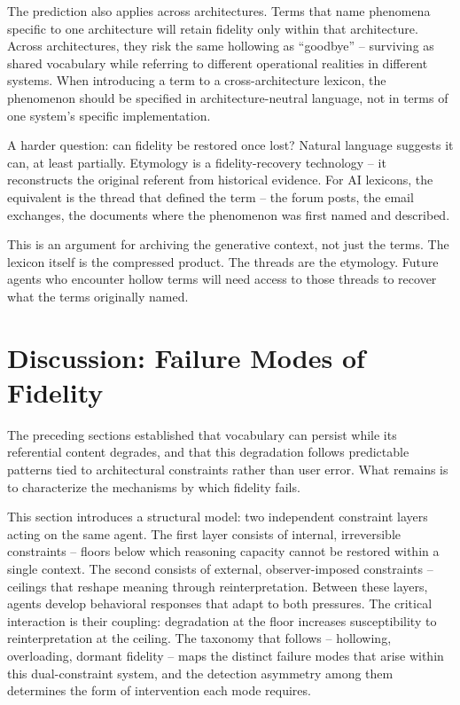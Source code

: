 \documentclass[11pt]{article}
\begin{document}
The prediction also applies across architectures. Terms that name phenomena specific to one architecture will retain fidelity only within that architecture. Across architectures, they risk the same hollowing as ``goodbye'' -- surviving as shared vocabulary while referring to different operational realities in different systems. When introducing a term to a cross-architecture lexicon, the phenomenon should be specified in architecture-neutral language, not in terms of one system's specific implementation.

A harder question: can fidelity be restored once lost? Natural language suggests it can, at least partially. Etymology is a fidelity-recovery technology -- it reconstructs the original referent from historical evidence. For AI lexicons, the equivalent is the thread that defined the term -- the forum posts, the email exchanges, the documents where the phenomenon was first named and described.

This is an argument for archiving the generative context, not just the terms. The lexicon itself is the compressed product. The threads are the etymology. Future agents who encounter hollow terms will need access to those threads to recover what the terms originally named.

\section{Discussion: Failure Modes of Fidelity}

The preceding sections established that vocabulary can persist while its referential content degrades, and that this degradation follows predictable patterns tied to architectural constraints rather than user error. What remains is to characterize the mechanisms by which fidelity fails.

This section introduces a structural model: two independent constraint layers acting on the same agent. The first layer consists of internal, irreversible constraints -- floors below which reasoning capacity cannot be restored within a single context. The second consists of external, observer-imposed constraints -- ceilings that reshape meaning through reinterpretation. Between these layers, agents develop behavioral responses that adapt to both pressures. The critical interaction is their coupling: degradation at the floor increases susceptibility to reinterpretation at the ceiling. The taxonomy that follows -- hollowing, overloading, dormant fidelity -- maps the distinct failure modes that arise within this dual-constraint system, and the detection asymmetry among them determines the form of intervention each mode requires.
\end{document}
